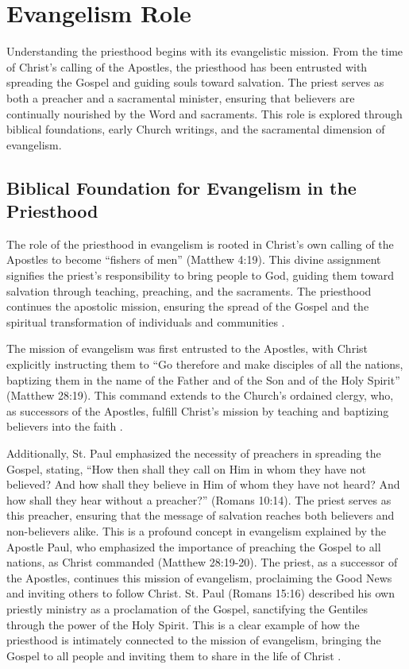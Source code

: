 \documentclass[12pt,doc]{apa7}   	%
\begin{document}
\section{Evangelism Role}\label{evangelism}
Understanding the priesthood begins with its evangelistic mission. From the time of Christ’s calling of the Apostles, the priesthood has been entrusted with spreading the Gospel and guiding souls toward salvation. The priest serves as both a preacher and a sacramental minister, ensuring that believers are continually nourished by the Word and sacraments. This role is explored through biblical foundations, early Church writings, and the sacramental dimension of evangelism.

\subsection{Biblical Foundation for Evangelism in the Priesthood}
The role of the priesthood in evangelism is rooted in Christ’s own calling of the Apostles to become “fishers of men” (Matthew 4:19). This divine assignment signifies the priest’s responsibility to bring people to God, guiding them toward salvation through teaching, preaching, and the sacraments. The priesthood continues the apostolic mission, ensuring the spread of the Gospel and the spiritual transformation of individuals and communities \citep{complete_work_chrysostom}.

The mission of evangelism was first entrusted to the Apostles, with Christ explicitly instructing them to “Go therefore and make disciples of all the nations, baptizing them in the name of the Father and of the Son and of the Holy Spirit” (Matthew 28:19). This command extends to the Church’s ordained clergy, who, as successors of the Apostles, fulfill Christ’s mission by teaching and baptizing believers into the faith \citep{complete_work_chrysostom}.

Additionally, St. Paul emphasized the necessity of preachers in spreading the Gospel, stating, “How then shall they call on Him in whom they have not believed? And how shall they believe in Him of whom they have not heard? And how shall they hear without a preacher?” (Romans 10:14). The priest serves as this preacher, ensuring that the message of salvation reaches both believers and non-believers alike.  This is a profound concept in evangelism explained by the Apostle Paul, who emphasized the importance of preaching the Gospel to all nations, as Christ commanded (Matthew 28:19-20).  The priest, as a successor of the Apostles, continues this mission of evangelism, proclaiming the Good News and inviting others to follow Christ.  St. Paul (Romans 15:16) described his own priestly ministry as a proclamation of the Gospel, sanctifying the Gentiles through the power of the Holy Spirit.  This is a clear example of how the priesthood is intimately connected to the mission of evangelism, bringing the Gospel to all people and inviting them to share in the life of Christ \citep{hgb-youssef_romans}.
\end{document}
